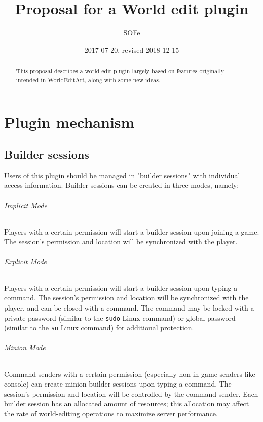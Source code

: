 \documentclass{report}
\title{Proposal for a World edit plugin}
\date{2017-07-20, revised 2018-12-15}
\author{SOFe}
\begin{document}

	\maketitle
	\tableofcontents

	\begin{abstract}
		This proposal describes a world edit plugin largely based on features originally intended in WorldEditArt,
		along with some new ideas.
	\end{abstract}

	\part{Plugin mechanism}
		\chapter{Builder sessions}
			Users of this plugin should be managed in "builder sessions" with individual access information. Builder
			sessions can be created in three modes, namely:
			\paragraph{Implicit Mode}
				Players with a certain permission will start a builder session upon joining a game. The session's
				permission and location will be synchronized with the player.
			\paragraph{Explicit Mode}
				Players with a certain permission will start a builder session upon typing a command. The session's
				permission and location will be synchronized with the player, and can be closed with a command. The
				command may be locked with a private password (similar to the \texttt{sudo} Linux command) or global
				password (similar to the \texttt{su} Linux command) for additional protection.
			\paragraph{Minion Mode}
				Command senders with a certain permission (especially non-in-game senders like console) can create
				minion builder sessions upon typing a command. The session's permission and location will be controlled
				by the command sender.
			Each builder session has an allocated amount of resources; this allocation may affect the rate of
			world-editing operations to maximize server performance.
\end{document}
